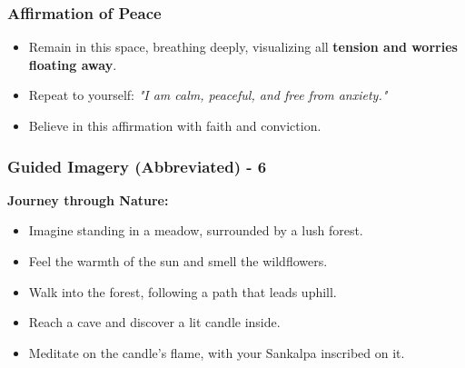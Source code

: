 \begin{frame}[fragile]\frametitle{Affirmation of Peace}
    \begin{itemize}
        \item Remain in this space, breathing deeply, visualizing all \textbf{tension and worries floating away}.
        \item Repeat to yourself: \textit{"I am calm, peaceful, and free from anxiety."}
        \item Believe in this affirmation with faith and conviction.
    \end{itemize}
\end{frame}


\begin{frame}[fragile]\frametitle{Guided Imagery (Abbreviated) - 6}
    \textbf{Journey through Nature:}
    \begin{itemize}
        \item Imagine standing in a meadow, surrounded by a lush forest.
        \item Feel the warmth of the sun and smell the wildflowers.
        \item Walk into the forest, following a path that leads uphill.
        \item Reach a cave and discover a lit candle inside.
        \item Meditate on the candle's flame, with your Sankalpa inscribed on it.
    \end{itemize}
\end{frame}

